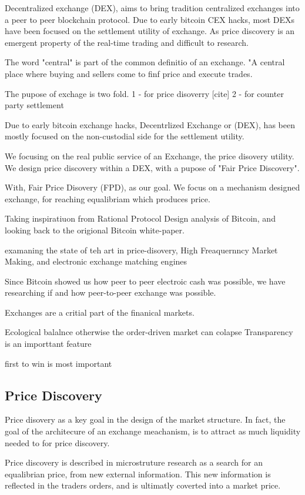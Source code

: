 \documentclass[12pt]{article}
\begin{document}
Decentralized exchange (DEX), aims to bring tradition centralized exchanges into a peer to peer blockchain protocol. Due to early bitcoin CEX hacks, most DEXs have been focused on the settlement utility of exchange. As price discovery is an emergent property of the real-time trading and difficult to research. 

 
The word "central" is part of the common definitio of an exchange. "A central place where buying and sellers come to finf price and execute trades. 

The pupose of exchage is two fold. 1 - for price disoverry [cite]  2 - for counter party settlement 

Due to early bitcoin exchange hacks, Decentrlized Exchange or (DEX), has been mostly focused on the non-custodial side for the settlement utility. 
 
We focusing on the real public service of an Exchange, the price disovery utility. We design price discovery within a DEX, with a pupose of "Fair Price Discovery". 

With, Fair Price Disovery (FPD), as our goal. We focus on a mechanism designed exchange, for reaching equalibriam which produces price. 

Taking inspiratiuon from Rational Protocol Design analysis of Bitcoin, and looking back to the origional Bitcoin white-paper. 


examaning the state of teh art in price-disovery, High Freaquernncy Market Making, and electronic exchange matching engines  

Since Bitcoin showed us how peer to peer electroic cash was possible, we have researching if and how peer-to-peer exchange was possible. 

Exchanges are a critial part of the finanical markets.  

Ecological balalnce otherwise the order-driven market can colapse 
Transparency is an importtant feature 

first to win is most important 


\subsection*{Price Discovery}
Price disovery as a key goal in the design of the market structure. In fact, the goal of the architecure of an exchange meachanism, is to attract as much liquidity needed to for price discovery.  \cite{francioni_schwartz_2017}

Price discovery is described in microstruture research as a search for an equalibrian price, from new external information. This new information is reflected in the traders orders, and is ultimatly coverted into a market price. \citep{RePEc:nbr:nberwo:6257}
\end{document}
